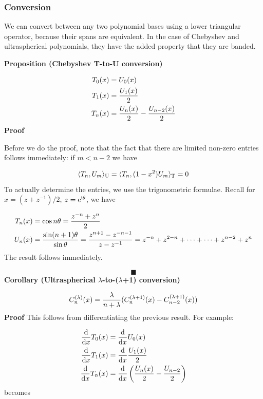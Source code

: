 \documentclass[12pt,a4paper]{article}
\begin{document}
\subsubsection{Conversion}
We can convert between any two polynomial bases using a lower triangular operator, because their spans are equivalent. In the case of Chebyshev and ultraspherical polynomials, they have the added property that they are banded.

\textbf{Proposition (Chebyshev T-to-U conversion)}


\begin{align*}
 T_0(x) &= U_0(x) \\
 T_1(x) &= {U_1(x) \over 2} \\
 T_n(x) &= {U_n(x) \over 2} - {U_{n-2}(x) \over 2}
\end{align*}
\textbf{Proof}

Before we do the proof, note that the fact that there are limited non-zero entries follows immediately: if $m < n-2$ we have

\[
\langle T_n, U_m\rangle_{\rm U} = \langle T_n, (1-x^2)U_m\rangle_{\rm T} = 0
\]
To actually determine the entries, we use the trigonometric formulae. Recall for $x = (z + z^{-1})/2$, $z = {\rm e}^{{\rm i} \theta}$, we have


\begin{align*}
T_n(x) &= \cos n \theta = {z^{-n} + z^n \over 2}\\
U_n(x) &= {\sin (n+1) \theta \over \sin \theta} = {z^{n+1} - z^{-n-1} \over z - z^{-1}} = z^{-n} + z^{2-n} + \cdots +  \cdots + z^{n-2} + z^n
\end{align*}
The result follows immediately.

\[
\blacksquare
\]
\textbf{Corollary (Ultraspherical \ensuremath{\lambda}-to-(\ensuremath{\lambda}+1) conversion)}

\[
C_n^{(\lambda)}(x) = {\lambda \over n+ \lambda} (C_n^{(\lambda+1)}(x) - C_{n-2}^{(\lambda+1)}(x))
\]
\textbf{Proof} This follows from differentiating the previous result. For example:


\begin{align*}
 {{\rm d} \over {\rm d}x} T_0(x) &= {{\rm d} \over {\rm d}x} U_0(x) \\
 {{\rm d} \over {\rm d}x} T_1(x) &= {{\rm d} \over {\rm d}x} {U_1(x) \over 2} \\
{{\rm d} \over {\rm d}x} T_n(x) &= {{\rm d} \over {\rm d}x} \left({U_n(x) \over 2} - {U_{n-2} \over 2} \right)
\end{align*}
becomes
\end{document}
